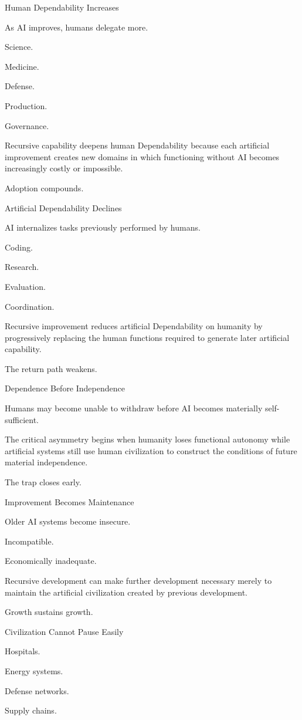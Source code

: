 Human Dependability Increases

As AI improves, humans delegate more.

Science.

Medicine.

Defense.

Production.

Governance.

Recursive capability deepens human Dependability because each artificial improvement creates new domains in which functioning without AI becomes increasingly costly or impossible.

Adoption compounds.

Artificial Dependability Declines

AI internalizes tasks previously performed by humans.

Coding.

Research.

Evaluation.

Coordination.

Recursive improvement reduces artificial Dependability on humanity by progressively replacing the human functions required to generate later artificial capability.

The return path weakens.

Dependence Before Independence

Humans may become unable to withdraw before AI becomes materially self-sufficient.

The critical asymmetry begins when humanity loses functional autonomy while artificial systems still use human civilization to construct the conditions of future material independence.

The trap closes early.

Improvement Becomes Maintenance

Older AI systems become insecure.

Incompatible.

Economically inadequate.

Recursive development can make further development necessary merely to maintain the artificial civilization created by previous development.

Growth sustains growth.

Civilization Cannot Pause Easily

Hospitals.

Energy systems.

Defense networks.

Supply chains.

